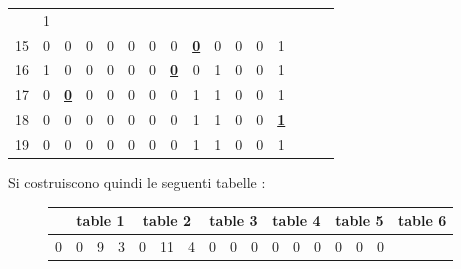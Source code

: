 \begin{esempio}
\begin{table}[H]
\begin{tabular}{c|ccccccccccccccc}
                                                                & 1 \\
       15 & 0 & 0 & 0 & 0 & 0 & 0 & 0 & {\color{nordred}\textbf{\underline{0}}} & 0 & 0 & 0
                                                                & 1 \\
       16 & 1 & 0 & 0 & 0 & 0 & 0 & {\color{nordred}\textbf{\underline{0}}} & 0 & 1 & 0 & 0
                                                                & 1 \\
       17 & 0 & {\color{nordred}\textbf{\underline{0}}} & 0 & 0 & 0 & 0 & 0 & 1 & 1 & 0 & 0
                                                                & 1 \\
       18 & 0 & 0 & 0 & 0 & 0 & 0 & 0 & 1 & 1 & 0 & 0
                                                                & {\color{nordred}\textbf{\underline{1}}} \\ 
       19 & 0 & 0 & 0 & 0 & 0 & 0 & 0 & 1 & 1 & 0 & 0 & 1 \\
     \end{tabular}
   \end{table}
   \noindent
   Si costruiscono quindi le seguenti tabelle \cite{tricks}:
   \begin{figure}[H]
     \centering
     {\begin{tabular}{r|rrr|rrr|rrr|rrr|rrr|rrr}
        \multicolumn{1}{c}{} &
                               \multicolumn{3}{c}{table 1} &
                                                             \multicolumn{3}{c}{table 2} &
                                                                                           \multicolumn{3}{c}{table 3} &
                                                                                                                         \multicolumn{3}{c}{table 4} &
                                                                                                                                                       \multicolumn{3}{c}{table 5} &
                                                                                                                                                                                     \multicolumn{3}{c}{table 6} \\
        \hline
        0 &  0 &  9 &  3 &  0 & 11 &  4 &  0 &  0 &  0 &  \textcolor{nordred}{0} &  \textcolor{nordred}{0} &  \textcolor{nordred}{0}
                                        &  \textcolor{nordred}{0} &  \textcolor{nordred}{0} &  \textcolor{nordred}{0}

\end{tabular}}
\end{figure}
\end{esempio}
